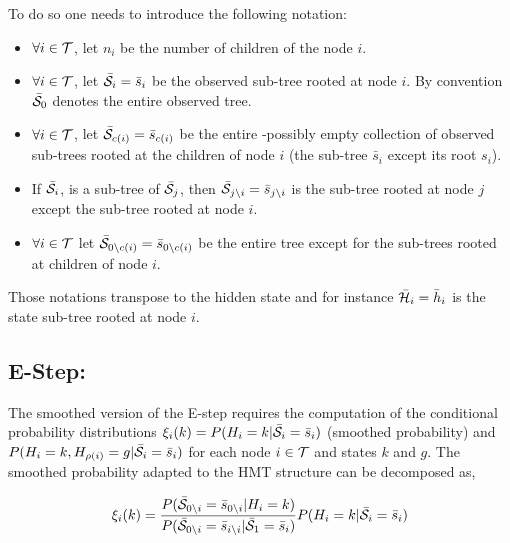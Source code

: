 \documentclass[a4paper,11pt]{report}
\begin{document}
    To do so one needs to introduce the following notation:\\
    \begin{itemize}
			\item $\forall i \in \mathcal{T}$, let $n_{i}$ be the number of children of the node $i$.\\
      \item $\forall i \in \mathcal{T}$, let $\bar{\mathcal{S}}_{i}= \bar{s}_{i}$ be the observed sub-tree rooted at node $i$. By convention $\bar{\mathcal{S}}_{0}$ denotes the entire observed tree.\\
      \item $\forall i \in \mathcal{T}$, let $\bar{\mathcal{S}}_{c(i)}= \bar{s}_{c(i)}$ be the entire -possibly empty collection of observed sub-trees rooted at the children of node $i$ (\ie the sub-tree $\bar{s}_{i}$ except its root $s_{i}$).\\
      \item If $\bar{\mathcal{S}}_{i}$, is a sub-tree of $\bar{\mathcal{S}}_{j}$, then $\bar{\mathcal{S}}_{j\backslash i} = \bar{s}_{j\backslash i}$ is the sub-tree rooted at node $j$ except the sub-tree rooted at node $i$.\\
      \item $\forall i \in \mathcal{T}$ let $\bar{\mathcal{S}}_{0\backslash c(i)}= \bar{s}_{0\backslash c(i)}$ be the entire tree except for the sub-trees rooted at children of node $i$.\\
    \end{itemize}
    
    \begin{note}
			Those notations transpose to the hidden state and for instance $\bar{\mathcal{H}}_{i}= \bar{h}_{i}$ is the state sub-tree rooted at node $i$.\\      
    \end{note}

    \subsection{E-Step:}
			\label{subsec:SCHMT/Learning/E}
			The smoothed version of the E-step requires the computation of the conditional probability distributions $\xi_{i}(k) = P(H_{i}=k | \bar{\mathcal{S}}_{i}= \bar{s}_{i})$ (smoothed probability) and $P(H_{i}=k, H_{\rho(i)}=g | \bar{\mathcal{S}}_{i}= \bar{s}_{i})$ for each node $i \in \mathcal{T}$ and states $k$ and $g$. The smoothed probability adapted to the HMT structure can be decomposed as,
			
			\begin{equation}
			  \xi_{i}(k) = 
					\frac{P(\bar{\mathcal{S}}_{0\backslash i}= \bar{s}_{0\backslash i} | H_{i}=k)}
						{P(\bar{\mathcal{S}}_{0\backslash i}= \bar{s}_{i\backslash i} | \bar{\mathcal{S}}_{1}= \bar{s}_{i})} 
					P(H_{i}= k |\bar{\mathcal{S}}_{i}= \bar{s}_{i})
				\label{eq:Smoothed P decomposition}
			\end{equation}
			
\end{document}

